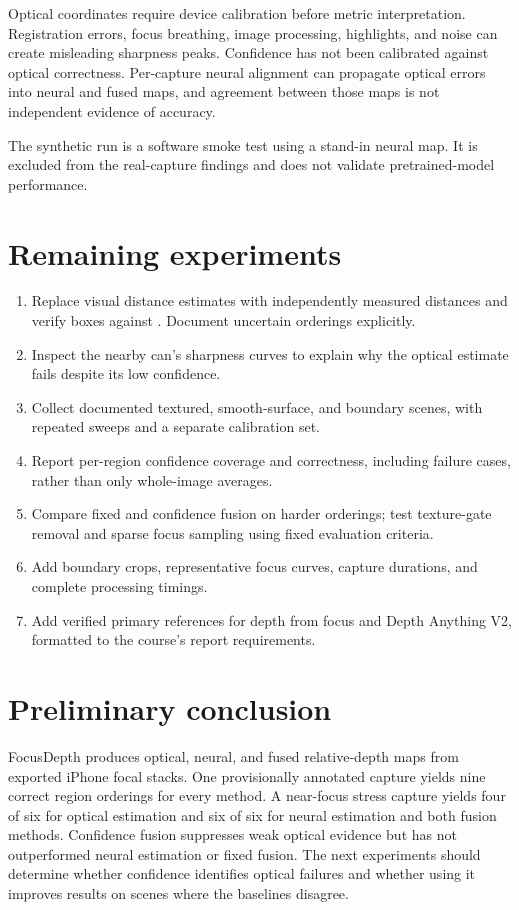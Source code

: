 \documentclass[11pt]{article}
\begin{document}
Optical coordinates require device calibration before metric interpretation. Registration errors, focus breathing, image processing, highlights, and noise can create misleading sharpness peaks. Confidence has not been calibrated against optical correctness. Per-capture neural alignment can propagate optical errors into neural and fused maps, and agreement between those maps is not independent evidence of accuracy.

The synthetic run is a software smoke test using a stand-in neural map. It is excluded from the real-capture findings and does not validate pretrained-model performance.

\section{Remaining experiments}

\begin{enumerate}
\item Replace visual distance estimates with independently measured distances and verify boxes against . Document uncertain orderings explicitly.
\item Inspect the nearby can's sharpness curves to explain why the optical estimate fails despite its low confidence.
\item Collect documented textured, smooth-surface, and boundary scenes, with repeated sweeps and a separate calibration set.
\item Report per-region confidence coverage and correctness, including failure cases, rather than only whole-image averages.
\item Compare fixed and confidence fusion on harder orderings; test texture-gate removal and sparse focus sampling using fixed evaluation criteria.
\item Add boundary crops, representative focus curves, capture durations, and complete processing timings.
\item Add verified primary references for depth from focus and Depth Anything V2, formatted to the course's report requirements.
\end{enumerate}

\section{Preliminary conclusion}

FocusDepth produces optical, neural, and fused relative-depth maps from exported iPhone focal stacks. One provisionally annotated capture yields nine correct region orderings for every method. A near-focus stress capture yields four of six for optical estimation and six of six for neural estimation and both fusion methods. Confidence fusion suppresses weak optical evidence but has not outperformed neural estimation or fixed fusion. The next experiments should determine whether confidence identifies optical failures and whether using it improves results on scenes where the baselines disagree.
\end{document}
